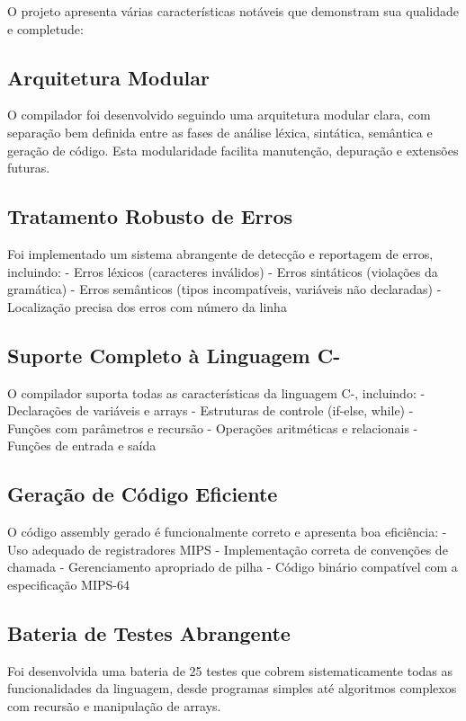\documentclass[
	12pt,				%
	oneside,
	a4paper,			%
	english,			%
	french,				%
	spanish,			%
	brazil,				%
	]{abntex2}
\begin{document}
O projeto apresenta várias características notáveis que demonstram sua qualidade e completude:

\subsection{Arquitetura Modular}

O compilador foi desenvolvido seguindo uma arquitetura modular clara, com separação bem definida entre as fases de análise léxica, sintática, semântica e geração de código. Esta modularidade facilita manutenção, depuração e extensões futuras.

\subsection{Tratamento Robusto de Erros}

Foi implementado um sistema abrangente de detecção e reportagem de erros, incluindo:
- Erros léxicos (caracteres inválidos)
- Erros sintáticos (violações da gramática)
- Erros semânticos (tipos incompatíveis, variáveis não declaradas)
- Localização precisa dos erros com número da linha

\subsection{Suporte Completo à Linguagem C-}

O compilador suporta todas as características da linguagem C-, incluindo:
- Declarações de variáveis e arrays
- Estruturas de controle (if-else, while)
- Funções com parâmetros e recursão
- Operações aritméticas e relacionais
- Funções de entrada e saída

\subsection{Geração de Código Eficiente}

O código assembly gerado é funcionalmente correto e apresenta boa eficiência:
- Uso adequado de registradores MIPS
- Implementação correta de convenções de chamada
- Gerenciamento apropriado de pilha
- Código binário compatível com a especificação MIPS-64

\subsection{Bateria de Testes Abrangente}

Foi desenvolvida uma bateria de 25 testes que cobrem sistematicamente todas as funcionalidades da linguagem, desde programas simples até algoritmos complexos com recursão e manipulação de arrays.
\end{document}
